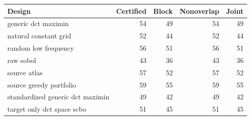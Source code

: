 \begin{tabular}{lrrrr}
\toprule
Design & Certified & Block & Nonoverlap & Joint \\
\midrule
generic dct maximin & 54 & 49 & 54 & 49 \\
natural constant grid & 52 & 44 & 52 & 44 \\
random low frequency & 56 & 51 & 56 & 51 \\
raw sobol & 43 & 36 & 43 & 36 \\
source atlas & 57 & 52 & 57 & 52 \\
source greedy portfolio & 59 & 55 & 59 & 55 \\
standardized generic dct maximin & 49 & 42 & 49 & 42 \\
target only dct space scbo & 51 & 45 & 51 & 45 \\
\bottomrule
\end{tabular}
